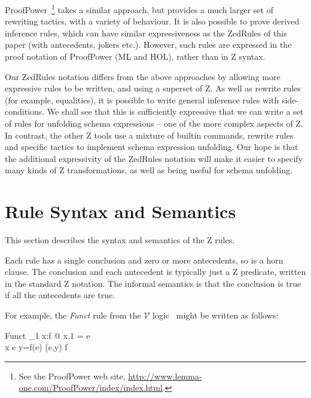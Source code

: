 \documentclass{entcs}
\newcommand{\V}{\mathcal{V}}
\begin{document}
ProofPower~\footnote{See the ProofPower web site,
\url{http://www.lemma-one.com/ProofPower/index/index.html}.} takes a
similar approach, but provides a much larger set of rewriting tactics,
with a variety of behaviour.  It is also possible to prove derived
inference rules, which can have similar expressiveness as the ZedRules
of this paper (with antecedents, jokers etc.).  However, such rules
are expressed in the proof notation of ProofPower (ML and HOL), rather
than in Z syntax.

Our ZedRules notation differs from the above approaches by allowing
more expressive rules to be written, and using a superset of Z.  As
well as rewrite rules (for example, equalities), it is possible to
write general inference rules with side-conditions.  We shall see that
this is sufficiently expressive that we can write a set of rules for
unfolding schema expressions -- one of the more complex aspects of Z.
In contrast, the other Z tools use a mixture of builtin commands,
rewrite rules and specific tactics to implement schema expression
unfolding.  Our hope is that the additional expressivity of the
ZedRules notation will make it easier to specify many kinds of Z
transformations, as well as being useful for schema unfolding.




\section{Rule Syntax and Semantics} \label{sec:syntax}

This section describes the syntax and semantics of the Z rules.

Each rule has a single conclusion and zero or more antecedents, so is a
horn clause.  The conclusion and each antecedent is typically just a Z
predicate, written in the standard Z notation.  The informal semantics
is that the conclusion is true if all the antecedents are true.

For example, the \emph{Funct} rule from the $\V$
logic~\cite{brien:calculus-schemas-z00} might be written as follows:
\begin{zedrule}{Funct}
  \exists_1 x:f @ x.1 = e \\
  x \notfreein e
\derives
  y=f(e) \iff (e,y) \in f
\end{zedrule}
\end{document}

